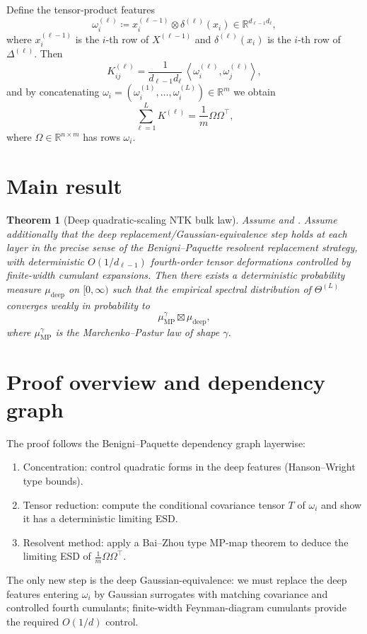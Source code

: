 \documentclass[anon]{colt2026}
\newcommand{\RR}{\mathbb{R}}
\newcommand{\ip}[2]{\left\langle #1,#2\right\rangle}
\newtheorem{thm}{Theorem}
\begin{document}
Define the tensor-product features
\[
  \omega_i^{(\ell)} \coloneqq x_i^{(\ell-1)}\otimes \delta^{(\ell)}(x_i)\in \RR^{d_{\ell-1}d_\ell},
\]
where $x_i^{(\ell-1)}$ is the $i$-th row of $X^{(\ell-1)}$ and $\delta^{(\ell)}(x_i)$ is the $i$-th row of $\Delta^{(\ell)}$.
Then
\[
  K^{(\ell)}_{ij}=\frac{1}{d_{\ell-1}d_\ell}\,\ip{\omega_i^{(\ell)}}{\omega_j^{(\ell)}},
\]
and by concatenating $\omega_i=(\omega_i^{(1)},\dots,\omega_i^{(L)})\in\RR^{m}$ we obtain
\[
  \sum_{\ell=1}^L K^{(\ell)} = \frac{1}{m}\Omega\Omega^\top,
\]
where $\Omega\in\RR^{n\times m}$ has rows $\omega_i$.

\section{Main result}
\label{sec:main}

\begin{thm}[Deep quadratic-scaling NTK bulk law]\label{thm:deep-main}
Assume  and .
Assume additionally that the deep replacement/Gaussian-equivalence step holds at each layer in the precise sense of the Benigni--Paquette resolvent replacement strategy, with deterministic $O(1/d_{\ell-1})$ fourth-order tensor deformations controlled by finite-width cumulant expansions.
Then there exists a deterministic probability measure $\mu_{\mathrm{deep}}$ on $[0,\infty)$ such that the empirical spectral distribution of $\Theta^{(L)}$ converges weakly in probability to
\[
  \mu_{\mathrm{MP}}^{\gamma}\boxtimes \mu_{\mathrm{deep}},
\]
where $\mu_{\mathrm{MP}}^{\gamma}$ is the Marchenko--Pastur law of shape $\gamma$.
\end{thm}

\section{Proof overview and dependency graph}
The proof follows the Benigni--Paquette dependency graph layerwise:
\begin{enumerate}
  \item Concentration: control quadratic forms in the deep features (Hanson--Wright type bounds).
  \item Tensor reduction: compute the conditional covariance tensor $T$ of $\omega_i$ and show it has a deterministic limiting ESD.
  \item Resolvent method: apply a Bai--Zhou type MP-map theorem to deduce the limiting ESD of $\frac{1}{m}\Omega\Omega^\top$.
\end{enumerate}
The only new step is the deep Gaussian-equivalence: we must replace the deep features entering $\omega_i$ by Gaussian surrogates with matching covariance and controlled fourth cumulants; finite-width Feynman-diagram cumulants provide the required $O(1/d)$ control.
\end{document}
